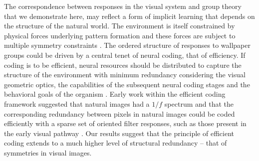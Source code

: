 \documentclass[11pt, twoside]{article}
\begin{document}
The correspondence between responses in the visual system and group theory that we demonstrate here, may reflect a form of implicit learning that depends on the structure of the natural world. The environment is itself constrained by physical forces underlying pattern formation and these forces are subject to multiple symmetry constraints \citep{RN1634}. The ordered structure of responses to wallpaper groups could be driven by a central tenet of neural coding, that of efficiency. If coding is to be efficient, neural resources should be distributed to capture the structure of the environment with minimum redundancy considering the visual geometric optics, the capabilities of the subsequent neural coding stages and the behavioral goals of the organism \citep{RN1758, RN1760, RN1757, RN1756}. Early work within the efficient coding framework suggested that natural images had a $1/f$ spectrum and that the corresponding redundancy between pixels in natural images could be coded efficiently with a sparse set of oriented filter responses, such as those present in the early visual pathway \citep{RN1740, RN1446}. Our results suggest that the principle of efficient coding extends to a much higher level of structural redundancy – that of symmetries in visual images. 
\end{document}
